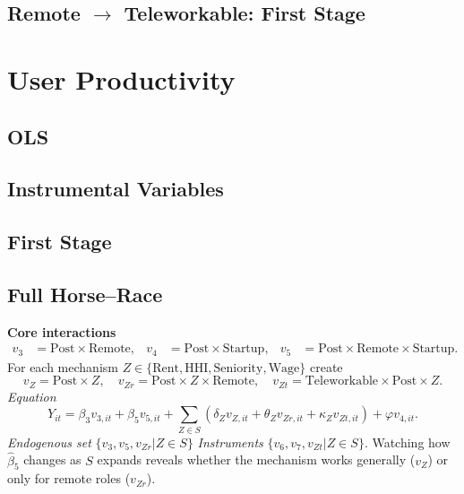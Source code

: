 \documentclass{article}
\newcommand{\cleanedresultsdir}{../results/cleaned}
\begin{document}
\subsection{Remote $\rightarrow$ Teleworkable: First Stage}



\clearpage
\section{User Productivity}
\label{sec:user_productivity}

\subsection{OLS}


\subsection{Instrumental Variables}


\subsection{First Stage}


\clearpage
\subsection*{Full Horse–Race}
\textbf{Core interactions}
\[\begin{aligned}
 v_3 &= \text{Post}\!\times\!\text{Remote}, &
 v_4 &= \text{Post}\!\times\!\text{Startup}, &
 v_5 &= \text{Post}\!\times\!\text{Remote}\!\times\!\text{Startup}. 
\end{aligned}\]
For each mechanism $Z\in\{\text{Rent},\text{HHI},\text{Seniority},\text{Wage}\}$ create
\[v_Z = \text{Post}\!\times\! Z,\quad v_{Zr}=\text{Post}\!\times\! Z\!\times\!\text{Remote},\quad v_{Zt}=\text{Teleworkable}\!\times\!\text{Post}\!\times\! Z.\]
\emph{Equation}
\[Y_{it}=\beta_3 v_{3,it}+\beta_5 v_{5,it}+\sum_{Z\in S}(\delta_Z v_{Z,it}+\theta_Z v_{Zr,it}+\kappa_Z v_{Zt,it})+\varphi v_{4,it}.
\]
\emph{Endogenous set}\; $\{v_3,v_5,v_{Zr}|Z\in S\}$ \quad\emph{Instruments}\; $\{v_6,v_7,v_{Zt}|Z\in S\}$.
Watching how $\widehat\beta_5$ changes as $S$ expands reveals whether the mechanism works generally ($v_Z$) or only for remote roles ($v_{Zr}$).
\end{document}
